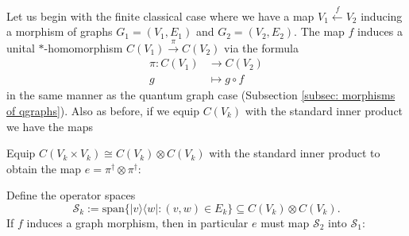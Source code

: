\documentclass[12pt]{article}
\theoremstyle{definition}
\newcommand{\Span}{\text{span}}
\newcommand{\mc}[1]{\mathcal{#1}}
\newcommand{\<}{\langle}
\renewcommand{\>}{\rangle}
\renewcommand{\subset}{\subseteq}
\begin{document}
Let us begin with the finite classical case where we have a map $V_1 \overset{f}{\leftarrow} V_2$ inducing a morphism of graphs $G_1 = (V_1, E_1)$ and $G_2 = (V_2, E_2)$. The map $f$ induces a unital $*$-homomorphism $C(V_1) \overset{\pi}{\to} C(V_2)$ via the formula
\begin{align*}
    \pi: C(V_1) &\to C(V_2) \\
    g &\mapsto g \circ f
\end{align*}
in the same manner as the quantum graph case (Subsection \ref{subsec: morphisms of qgraphs}). Also as before, if we equip $C(V_k)$ with the standard inner product we have the maps
    \begin{center}
    \end{center}
    Equip $C(V_k \times V_k) \cong C(V_k) \otimes C(V_k) $ with the standard inner product to obtain the map $e = \pi^\dagger \otimes \pi^\dagger$:
    \begin{center}
    \end{center}
    Define the operator spaces
    \[
    \mc S_k := \Span\{|v\>\<w| : (v,w) \in E_k\} \subset C(V_k) \otimes C(V_k).
    \]
    If $f$ induces a graph morphism, then in particular $e$ must map $\mc S_2$ into $\mc S_1$:
    \begin{center}
    \end{center}
\end{document}
